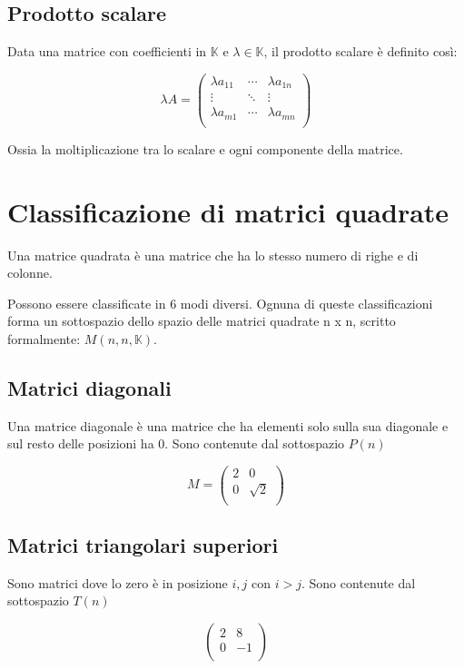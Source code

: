 \documentclass[a4paper, 10pt]{article}
\begin{document}
\subsection{Prodotto scalare}

Data una matrice con coefficienti in $\mathbb{K}$ e $ \lambda \in \mathbb{K} $, il prodotto scalare è definito così:

$$\lambda A=\left(\begin{matrix}\lambda a_{11}&\cdots&\lambda a_{1n}\\\vdots&\ddots&\vdots\\\lambda a_{m1}&\cdots&\lambda a_{mn}\\\end{matrix}\right)$$


Ossia la moltiplicazione tra lo scalare e ogni componente della matrice.

\section{Classificazione di matrici quadrate}

Una matrice quadrata è una matrice che ha lo stesso numero di righe e di colonne.

Possono essere classificate in 6 modi diversi. Ognuna di queste classificazioni forma un sottospazio dello spazio delle matrici quadrate n x n, scritto formalmente: $M(n, n, \mathbb{K})$.

\subsection{Matrici diagonali}

Una matrice diagonale è una matrice che ha elementi solo sulla sua diagonale e sul resto delle posizioni ha 0. Sono contenute dal sottospazio $P(n)$

$$ M = \left(\begin{matrix}2&0\\0&\sqrt2\\\end{matrix}\right)$$

\subsection{Matrici triangolari superiori}
Sono matrici dove lo zero è in posizione $ i, j $ con $ i > j$. Sono contenute dal sottospazio $T(n)$

$$\left(\begin{matrix}2&8\\0&-1\\\end{matrix}\right)$$ 
\end{document}
